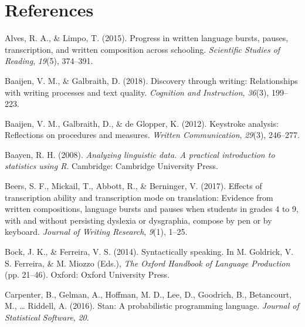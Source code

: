 \documentclass[
  english,
  man,mask,floatsintext]{apa7}
\newlength{\cslhangindent}
\newenvironment{cslreferences}%
  {\setlength{\parindent}{0pt}%
  \everypar{\setlength{\hangindent}{\cslhangindent}}\ignorespaces}%
  {\par}
\begin{document}
\hypertarget{references}{%
\section{References}\label{references}}

\begingroup
\setlength{\parindent}{-0.5in}
\setlength{\leftskip}{0.5in}

\hypertarget{ref}{}

\endgroup

\hypertarget{refs}{}
\begin{cslreferences}
\leavevmode\hypertarget{ref-alves2015progress}{}%
Alves, R. A., \& Limpo, T. (2015). Progress in written language bursts, pauses, transcription, and written composition across schooling. \emph{Scientific Studies of Reading}, \emph{19}(5), 374--391.

\leavevmode\hypertarget{ref-baaijen2018discovery}{}%
Baaijen, V. M., \& Galbraith, D. (2018). Discovery through writing: Relationships with writing processes and text quality. \emph{Cognition and Instruction}, \emph{36}(3), 199--223.

\leavevmode\hypertarget{ref-baaijen2012keystroke}{}%
Baaijen, V. M., Galbraith, D., \& de Glopper, K. (2012). Keystroke analysis: Reflections on procedures and measures. \emph{Written Communication}, \emph{29}(3), 246--277.

\leavevmode\hypertarget{ref-baa08book}{}%
Baayen, R. H. (2008). \emph{Analyzing linguistic data. A practical introduction to statistics using R}. Cambridge: Cambridge University Press.

\leavevmode\hypertarget{ref-beers2017effects}{}%
Beers, S. F., Mickail, T., Abbott, R., \& Berninger, V. (2017). Effects of transcription ability and transcription mode on translation: Evidence from written compositions, language bursts and pauses when students in grades 4 to 9, with and without persisting dyslexia or dysgraphia, compose by pen or by keyboard. \emph{Journal of Writing Research}, \emph{9}(1), 1--25.

\leavevmode\hypertarget{ref-bock2014syntactically}{}%
Bock, J. K., \& Ferreira, V. S. (2014). Syntactically speaking. In M. Goldrick, V. S. Ferreira, \& M. Miozzo (Eds.), \emph{The Oxford Handbook of Language Production} (pp. 21--46). Oxford: Oxford University Press.

\leavevmode\hypertarget{ref-carpenter2016stan}{}%
Carpenter, B., Gelman, A., Hoffman, M. D., Lee, D., Goodrich, B., Betancourt, M., \ldots{} Riddell, A. (2016). Stan: A probabilistic programming language. \emph{Journal of Statistical Software}, \emph{20}.


\end{cslreferences}
\end{document}
